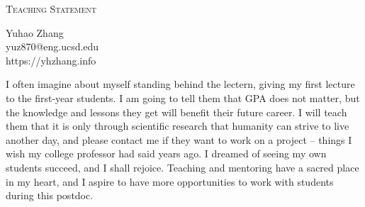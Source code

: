 \documentclass[letterpaper]{article}
\makeatletter
\newcommand{\soptitle}{Teaching Statement}
\newcommand{\yourname}{Yuhao Zhang}
\newcommand{\youremail}{yuz870@eng.ucsd.edu}
\newcommand{\amper}{{\fontspec[Scale=1]{Adobe Caslon Pro}\selectfont\itshape\&~{}}}
\makeatother
\begin{document}
\begin{center}{\huge \scshape \soptitle}\end{center}
\begin{center}\vspace{0.2em} {\Large \yourname\\}
  {\youremail\\} {https://yhzhang.info}\end{center}

\noindent I often imagine about myself standing behind the lectern, giving my first lecture to the first-year students. I am going to tell them that GPA does not matter, but the knowledge and lessons they get will benefit their future career. I will teach them that it is only through scientific research that humanity can strive to live another day, and please contact me if they want to work on a project -- things I wish my college professor had said years ago. I dreamed of seeing my own students succeed, and I shall rejoice. Teaching and mentoring have a sacred place in my heart, and I aspire to have more opportunities to work with students during this postdoc.
\end{document}
